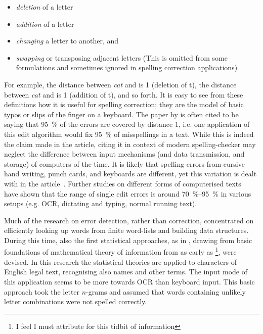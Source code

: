 \documentclass[officiallayout]{unihelcompling}
\newcommand\misspelt{\bgroup\markoverwith
{\textcolor{red}{\lower3.5pt\hbox{\sixly \char58}}}\ULon}
\begin{document}
\begin{itemize}
    \item \emph{deletion} of a letter
    \item \emph{addition} of a letter
    \item \emph{changing} a letter to another, and
    \item \emph{swapping} or transposing adjacent letters
        (This is omitted from some formulations and sometimes ignored in
        spelling correction applications)
\end{itemize}

For example, the distance between \emph{cat} and \misspelt{ca} is 1 (deletion
of t), the distance between \emph{cat} and \misspelt{catt} is 1 (addition of
t), and so forth.  It is easy to see from these definitions how it is useful
for spelling correction; they are the model of basic typos or slips of the
finger on a keyboard. The paper by \citet{damerau1964technique} is often cited
to be saying that 95~\% of the errors are covered by distance 1, i.e. one
application of this edit algorithm would fix 95~\% of misspellings in a text.
While this is indeed the claim made in the article, citing it in context of
modern spelling-checker may neglect the difference between input mechanisms
(and data transmission, and storage) of computers of the time. It is likely
that spelling errors from cursive hand writing, punch cards, and keyboards are
different, yet this variation is dealt with in the
article~\citep{damerau1964technique}. Further studies on different forms of
computerised texts~\citep{kukich1992techniques} have shown that the range of
single edit errors is around 70~\%--95~\% in various setups (e.g. OCR,
dictating and typing, normal running text).

Much of the research on error detection, rather than correction, concentrated
on efficiently looking up words from finite word-lists and building data
structures. During this time, also the first statistical approaches, as in
\citet{raviv1967decision}, drawing from basic foundations of mathematical
theory of information from as early as
\citet{shannon1948mathematical}\footnote{I feel I must attribute
\citet{liberman2012noisily} for this tidbit of information}, were devised. In
this research the statistical theories are applied to characters of English
legal text, recognising also names and other terms. The input mode of this
application seems to be more towards OCR than keyboard input. This basic
approach took the letter \(n\)-grams and assumed that words containing unlikely
letter combinations were not spelled correctly.
\end{document}
